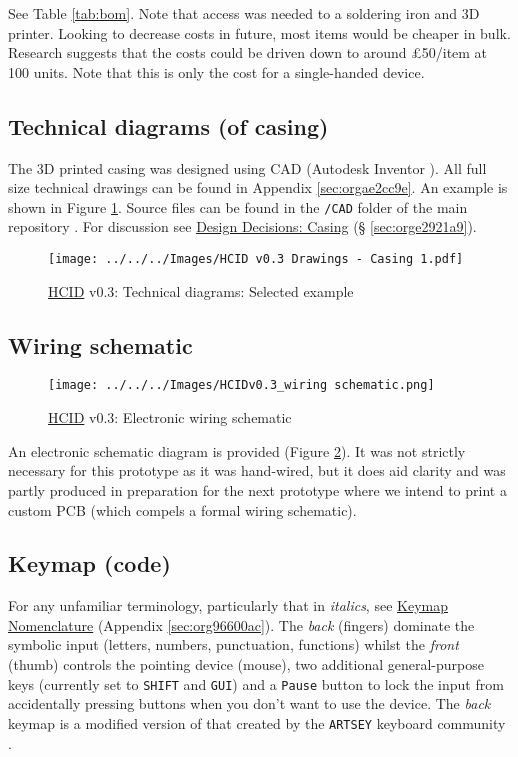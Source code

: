 \documentclass[logo,bsc,singlespacing,parskip]{infthesis}
\begin{document}
See Table \ref{tab:bom}.
Note that access was needed to a soldering iron and 3D printer.
Looking to decrease costs in future, most items would be cheaper in bulk.
Research suggests that the costs could be driven down to around £50/item at 100 units.
Note that this is only the cost for a single-handed device.
\subsection{Technical diagrams (of casing)}
\label{sec:orgb35916e}
The 3D printed casing was designed using CAD (Autodesk Inventor \autocite{InventorSoftwareGet}).
All full size technical drawings can be found in Appendix \ref{sec:orgae2cc9e}.
An example is shown in Figure \ref{fig:tech_draw_ex}.
Source files can be found in the \texttt{/CAD} folder of the main repository \autocite{sharpNazzacodeHCIDMy}.
For discussion see \hyperref[sec:orge2921a9]{Design Decisions: Casing} (§ \ref{sec:orge2921a9}).

\begin{figure}[h]
\centering
\texttt{[image: ../../../Images/HCID v0.3 Drawings - Casing 1.pdf]}
\caption{\label{fig:tech_draw_ex}\hyperref[org30e2275]{HCID} v0.3: Technical diagrams: Selected example}
\end{figure}
\subsection{Wiring schematic}
\label{sec:orga091d61}
\begin{figure}[h]
\centering
\texttt{[image: ../../../Images/HCIDv0.3\_wiring schematic.png]}
\caption{\label{fig:wiring_schematic}\hyperref[org30e2275]{HCID} v0.3: Electronic wiring schematic}
\end{figure}

An electronic schematic diagram is provided (Figure \ref{fig:wiring_schematic}).
It was not strictly necessary for this prototype as it was hand-wired, but it does aid clarity and was partly produced in preparation for the next prototype where we intend to print a custom PCB (which compels a formal wiring schematic).
\subsection{Keymap (code)}
\label{sec:org11501e5}
For any unfamiliar terminology, particularly that in \emph{italics}, see \hyperref[sec:org96600ac]{Keymap Nomenclature} (Appendix \ref{sec:org96600ac}).
The \emph{back} (fingers) dominate the symbolic input (letters, numbers, punctuation, functions) whilst the \emph{front} (thumb) controls the pointing device (mouse), two additional general-purpose keys (currently set to \texttt{SHIFT} and \texttt{GUI}) and a \texttt{Pause} button to lock the input from accidentally pressing buttons when you don't want to use the device.
The \emph{back} keymap is a modified version of that created by the \texttt{ARTSEY} keyboard community \autocite{ARTSEYEasyFast}.
\end{document}
